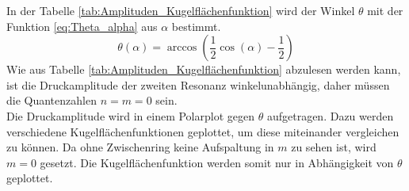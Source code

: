 \FloatBarrier
In der Tabelle \ref{tab:Amplituden_Kugelflächenfunktion} wird der Winkel $\theta$ mit der Funktion \eqref{eq:Theta_alpha} aus $\alpha$ bestimmt.
\begin{equation}
    \label{eq:Theta_alpha}
    \theta(\alpha) = \arccos\left( \frac{1}{2} \cos\left( \alpha \right) -\frac{1}{2} \right)
\end{equation}
Wie aus Tabelle \ref{tab:Amplituden_Kugelflächenfunktion} abzulesen werden kann, ist die Druckamplitude der zweiten Resonanz 
winkelunabhängig, daher müssen die Quantenzahlen $n=m=0$ sein.\\
Die Druckamplitude wird in einem Polarplot gegen $\theta$ aufgetragen. Dazu werden verschiedene Kugelflächenfunktionen 
geplottet, um diese miteinander vergleichen zu können. Da ohne Zwischenring keine Aufspaltung in $m$ zu sehen ist, wird $m=0$ gesetzt.
Die Kugelflächenfunktion werden somit nur in Abhängigkeit von $\theta$ geplottet.
\FloatBarrier
